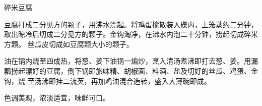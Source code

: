 \begin{recipe}{碎米豆腐}

\ingredients


\preparation

\step 豆腐打成二分见方的颗子，用沸水漂起。将鸡蛋搅散装入碟内，上笼蒸约二分钟，
取出晾冷后切成二分见方的颗子。金钩淘净，在沸水内泡二十分钟，捞起切成碎米方颗。
丝瓜皮切成如豆腐颗大小的颗子。

\step 油在锅内烧至四成热，将葱、姜下油锅一煸炒，烹入清汤煮沸即打去葱、姜。用漏
瓢捞起漂好的豆腐，倒下锅即旅味精、胡椒面、料酒、盐及切好的丝瓜、鸡蛋、金钩，烧
至汤沸即挂二流芡，再加鸡油混合造转，盛入大薄碗即成。

\features

色调美观，浓淡适宜，味鲜可口。

\end{recipe}


